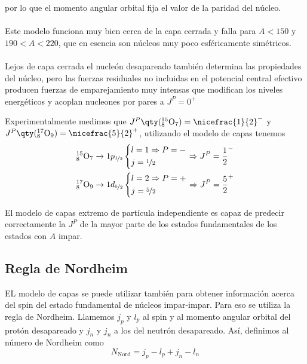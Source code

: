 por lo que el momento angular orbital fija el valor de la paridad del núcleo. \\\\
Este modelo funciona muy bien cerca de la capa cerrada y falla para $A<150$ y $190<A<220$, que en esencia son núcleos muy poco esféricamente simétricos.\\\\
Lejos de capa cerrada el nucleón desapareado también determina las propiedades del núcleo, pero las fuerzas residuales no incluidas en el potencial central efectivo producen fuerzas de emparejamiento muy intensas que modifican los niveles energéticos y acoplan nucleones por pares a $J^P=0^+$
\begin{tcolorbox}[colback=airforceblue!20, colframe=airforceblue, title={Ejemplo: $J^P$ de los isótopos $^{15}\mathrm{O}$ y $^{17}\mathrm{O}$}]
    Experimentalmente medimos que $J^P\qty(^{15}_8\mathrm{O}_7)=\nicefrac{1}{2}^-$ y $J^P\qty(^{17}_8\mathrm{O}_9)=\nicefrac{5}{2}^+$, utilizando el modelo de capas tenemos 
    $$\begin{aligned}
        &^{15}_8\mathrm{O}_7 \xrightarrow[]{} 1p_{\nicefrac{1}{2}} \left \{ \begin{aligned}
            &l=1 \Rightarrow P=-\\
            &j=\nicefrac{1}{2}
        \end{aligned} \right. \Rightarrow J^P=\frac{1}{2}^-\\
        &^{17}_8\mathrm{O}_9 \xrightarrow[]{} 1d_{\nicefrac{5}{2}} \left \{ \begin{aligned}
        &l=2 \Rightarrow P=+ \\
            &j=\nicefrac{5}{2}
        \end{aligned} \right. \Rightarrow J^P=\frac{5}{2}^+
    \end{aligned}$$

    El modelo de capas extremo de partícula independiente es capaz de predecir correctamente la $J^P$ de la mayor parte de los estados fundamentales de los estados con $A$ impar.
\end{tcolorbox}
\subsection{Regla de Nordheim}

EL modelo de capas se  puede utilizar también para obtener información acerca del spin del estado fundamental de núcleos impar-impar. Para eso se utiliza la regla de Nordheim. Llamemos $j_p$ y $l_p$ al spin y al momento angular orbital del protón desapareado y $j_n$ y $j_n$ a los del neutrón desapareado. Así, definimos al número de Nordheim como
\begin{equation}
    N_\mathrm{Nord}=j_p-l_p+j_n-l_n
    \label{eq: numero de nordheim}
\end{equation}


